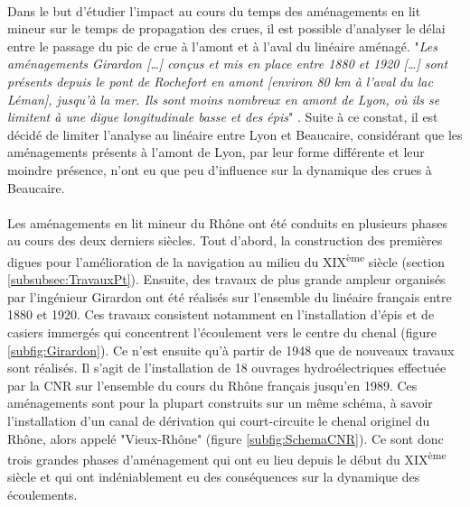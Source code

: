 \documentclass[11pt]{article}
\begin{document}
	\paragraph{} Dans le but d'étudier l'impact au cours du temps des aménagements en lit mineur sur le temps de propagation des crues, il est possible d'analyser le délai entre le passage du pic de crue à l'amont et à l'aval du linéaire aménagé. "\textit{Les aménagements Girardon […] conçus et mis en place entre 1880 et 1920 […] sont présents depuis le pont de Rochefort en amont [environ 80 km à l'aval du lac Léman], jusqu'à la mer. Ils sont moins nombreux en amont de Lyon, où ils se limitent à une digue longitudinale basse et des épis}" \citep{gaydou_schema_2013}. Suite à ce constat, il est décidé de limiter l'analyse au linéaire entre Lyon et Beaucaire, considérant que les aménagements présents à l'amont de Lyon, par leur forme différente et leur moindre présence, n'ont eu que peu d'influence sur la dynamique des crues à Beaucaire.
	
	\paragraph{} Les aménagements en lit mineur du Rhône ont été conduits en plusieurs phases au cours des deux derniers siècles. Tout d'abord, la construction des premières digues pour l'amélioration de la navigation au milieu du XIX\textsuperscript{ème} siècle (section \ref{subsubsec:TravauxPt}). Ensuite, des travaux de plus grande ampleur organisés par l'ingénieur Girardon ont été réalisés sur l'ensemble du linéaire français entre 1880 et 1920. Ces travaux consistent notamment en l'installation d'épis et de casiers immergés qui concentrent l'écoulement vers le centre du chenal (figure \ref{subfig:Girardon}). Ce n'est ensuite qu'à partir de 1948 que de nouveaux travaux sont réalisés. Il s'agit de l'installation de 18 ouvrages hydroélectriques effectuée par la CNR sur l'ensemble du cours du Rhône français jusqu'en 1989. Ces aménagements sont pour la plupart construits sur un même schéma, à savoir l'installation d'un canal de dérivation qui court-circuite le chenal originel du Rhône, alors appelé "Vieux-Rhône" (figure \ref{subfig:SchemaCNR}). Ce sont donc trois grandes phases d'aménagement qui ont eu lieu depuis le début du XIX\textsuperscript{ème} siècle et qui ont indéniablement eu des conséquences sur la dynamique des écoulements. 
	
\end{document}
